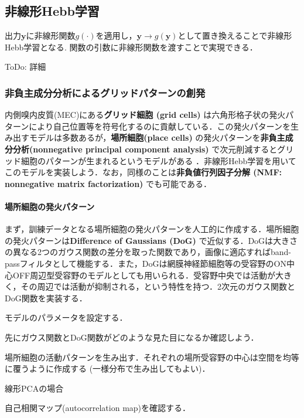 \subsection{非線形Hebb学習}
出力$\mathbf{y}$に非線形関数$g(\cdot)$を適用し，$\mathbf{y}\to g(\mathbf{y})$として置き換えることで非線形Hebb学習となる\cite{Oja1997-hr}\cite{Brito2016-mx}. 関数の引数に非線形関数を渡すことで実現できる．

ToDo: 詳細
\subsubsection{非負主成分分析によるグリッドパターンの創発}
内側嗅内皮質(MEC)にある\textbf{グリッド細胞 (grid cells)} は六角形格子状の発火パターンにより自己位置等を符号化するのに貢献している．この発火パターンを生み出すモデルは多数あるが，\textbf{場所細胞(place cells)} の発火パターンを\textbf{非負主成分分析(nonnegative principal component analysis)} で次元削減するとグリッド細胞のパターンが生まれるというモデルがある \cite{Dordek2016-ff}．非線形Hebb学習を用いてこのモデルを実装しよう．なお，同様のことは\textbf{非負値行列因子分解 (NMF: nonnegative matrix factorization)} でも可能である．
\paragraph{場所細胞の発火パターン}
まず，訓練データとなる場所細胞の発火パターンを人工的に作成する．場所細胞の発火パターンは\textbf{Difference of Gaussians (DoG)} で近似する．DoGは大きさの異なる2つのガウス関数の差分を取った関数であり，画像に適応すればband-passフィルタとして機能する．また，DoGは網膜神経節細胞等の受容野のON中心OFF周辺型受容野のモデルとしても用いられる．受容野中央では活動が大きく，その周辺では活動が抑制される，という特性を持つ．2次元のガウス関数とDoG関数を実装する．

モデルのパラメータを設定する．

先にガウス関数とDoG関数がどのような見た目になるか確認しよう．



場所細胞の活動パターンを生み出す．それぞれの場所受容野の中心は空間を均等に覆うように作成する (一様分布で生み出してもよい)．

線形PCAの場合



自己相関マップ(autocorrelation map)を確認する．

